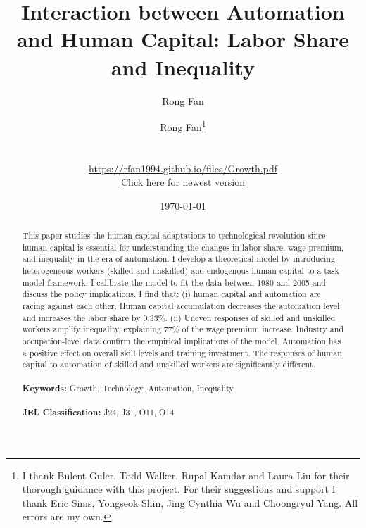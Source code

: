 \documentclass[12pt]{article}
\date{}
\author{Rong Fan}
\begin{document}
\begin{titlepage}
\title{Interaction between Automation and Human Capital: Labor Share and Inequality}
\author{Rong Fan\thanks{I thank Bulent Guler, Todd Walker, Rupal Kamdar and Laura Liu for their thorough guidance with this project. For their suggestions and support I thank Eric Sims, Yongseok Shin, Jing Cynthia Wu and Choongryul Yang. All errors are my own.} 
\\
\\
\\ \href{https://rfan1994.github.io/files/Growth.pdf}{https://rfan1994.github.io/files/Growth.pdf}
\\ \href{https://rfan1994.github.io/files/Growth.pdf}{Click here for newest version}}
\date{\today}
\maketitle

\begin{abstract}
\noindent This paper studies the human capital adaptations to technological revolution since human capital is essential for understanding the changes in labor share, wage premium, and inequality in the era of automation. I develop a theoretical model by introducing heterogeneous workers (skilled and unskilled) and endogenous human capital to a task model framework. I calibrate the model to fit the data between 1980 and 2005 and discuss the policy implications. I find that: (i) human capital and automation are racing against each other. Human capital accumulation decreases the automation level and increases the labor share by 0.33\%. (ii) Uneven responses of skilled and unskilled workers amplify inequality, explaining 77\% of the wage premium increase. Industry and occupation-level data confirm the empirical implications of the model. Automation has a positive effect on overall skill levels and training investment. The responses of human capital to automation of skilled and unskilled workers are significantly different.  \\
\vspace{0in}\\
\noindent\textbf{Keywords:} Growth, Technology, Automation, Inequality\\
\vspace{0in}\\
\noindent\textbf{JEL Classification: } J24, J31, O11, O14\\

\bigskip
\end{abstract}
\setcounter{page}{0}
\thispagestyle{empty}
\end{titlepage}
\pagebreak \newpage
\end{document}
